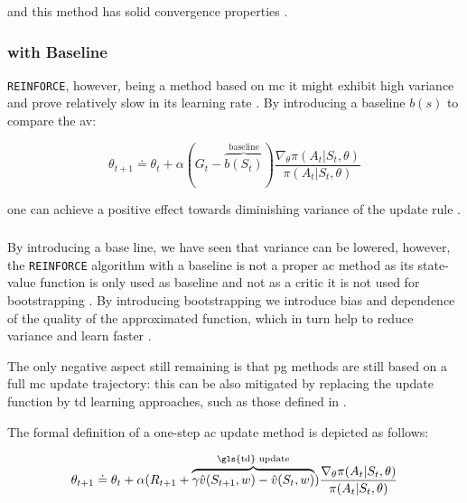 \documentclass[draft=false]{seal_thesis}
\begin{document}
and this method has solid convergence properties \citep[p. 271]{Sutton2017}.

\subsubsection{ with Baseline}

\texttt{REINFORCE}, however, being a method based on \gls{mc} it might exhibit high variance and prove relatively slow in its learning rate \citep[p. 271]{Sutton2017}. By introducing a baseline $b(s)$ to compare the \gls{av}:

\begin{equation}
	\theta_{t+1} \doteq \theta_t + \alpha (G_t - \overbrace{b(S_t)}^{\text{baseline}}) \frac{\nabla_\theta \pi(A_t|S_t,\theta)}{\pi(A_t|S_t,\theta)}
\end{equation}

one can achieve a positive effect towards diminishing variance of the update rule \citep[p. 271]{Sutton2017}.

\subsubsection{ }

By introducing a base line, we have seen that variance can be lowered, however, the \texttt{REINFORCE} algorithm with a baseline is not a proper \gls{ac} method as its state-value function is only used as baseline and not as a critic \ie it is not used for bootstrapping \citep[p. 273]{Sutton2017}. By introducing bootstrapping we introduce bias and dependence of the quality of the approximated function, which in turn help to reduce variance and learn faster \citep[p. 273]{Sutton2017}. 

The only negative aspect still remaining is that \gls{pg} methods are still based on a full \gls{mc} update trajectory: this can be also mitigated by replacing the update function by \gls{td} learning approaches, such as those defined in  \citep[p. 273]{Sutton2017}.

The formal definition of a one-step \gls{ac} update method is depicted as follows:

\begin{equation}
	\theta_{t+1} \doteq \theta_t + \alpha(R_{t+1} + \overbrace{\gamma \hat{v}(S_{t+1},w)-\hat{v}(S_t,w)}^{\text{\gls{td} update}}) \frac{\nabla_\theta \pi(A_t|S_t,\theta)}{\pi(A_t|S_t,\theta)}
\end{equation}
\end{document}
